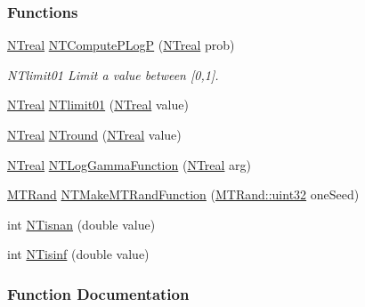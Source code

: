 \subsubsection*{Functions}
\begin{DoxyCompactItemize}
\item 
\hyperlink{nt__types_8h_a814a97893e9deb1eedcc7604529ba80d}{NTreal} \hyperlink{nt__aux__math__func_8h_af9447a0783cc9981e29296ee260b6e70}{NTComputePLogP} (\hyperlink{nt__types_8h_a814a97893e9deb1eedcc7604529ba80d}{NTreal} prob)
\begin{DoxyCompactList}\small\item\em NTlimit01 Limit a value between \mbox{[}0,1\mbox{]}. \item\end{DoxyCompactList}\item 
\hyperlink{nt__types_8h_a814a97893e9deb1eedcc7604529ba80d}{NTreal} \hyperlink{nt__aux__math__func_8h_a4f822883c561a6fade4e50d398134778}{NTlimit01} (\hyperlink{nt__types_8h_a814a97893e9deb1eedcc7604529ba80d}{NTreal} value)
\item 
\hyperlink{nt__types_8h_a814a97893e9deb1eedcc7604529ba80d}{NTreal} \hyperlink{nt__aux__math__func_8h_a437b45c5fbce8225f6d76a3604865b8a}{NTround} (\hyperlink{nt__types_8h_a814a97893e9deb1eedcc7604529ba80d}{NTreal} value)
\item 
\hyperlink{nt__types_8h_a814a97893e9deb1eedcc7604529ba80d}{NTreal} \hyperlink{nt__aux__math__func_8h_a24fb330c0b036476cc1a959c0b5c920e}{NTLogGammaFunction} (\hyperlink{nt__types_8h_a814a97893e9deb1eedcc7604529ba80d}{NTreal} arg)
\item 
\hyperlink{class_m_t_rand}{MTRand} \hyperlink{nt__aux__math__func_8h_abcf4a144ee4d1b47ec76f0bd248c7458}{NTMakeMTRandFunction} (\hyperlink{class_m_t_rand_a45478edf9e24dcd2a5164bac3889d6a2}{MTRand::uint32} oneSeed)
\item 
int \hyperlink{nt__aux__math__func_8h_addca8e142da42d69409b9dd482352d14}{NTisnan} (double value)
\item 
int \hyperlink{nt__aux__math__func_8h_a7a3caa9837447819941934b21df338b9}{NTisinf} (double value)
\end{DoxyCompactItemize}


\subsubsection{Function Documentation}
